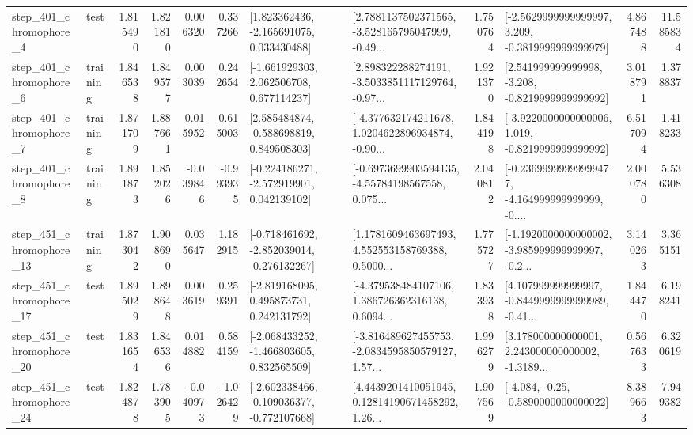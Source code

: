 \begin{tabular}{llrrrrllrlrr}
   step\_401\_chromophore\_4 &      test &      1.815490 &    1.821810 &      0.006320 &  0.337266 &    [1.823362436, -2.165691075, 0.033430488] &  [2.7881137502371565, -3.528165795047999, -0.49... &       1.750764 &  [-2.5629999999999997, 3.209, -0.3819999999999979] &            4.867488 &         11.585834 \\
   step\_401\_chromophore\_6 &  training &      1.846538 &    1.849577 &      0.003039 &  0.242654 &    [-1.661929303, 2.062506708, 0.677114237] &  [2.898322288274191, -3.5033851117129764, -0.97... &       1.921370 &   [2.541999999999998, -3.208, -0.8219999999999992] &            3.018791 &          1.378837 \\
   step\_401\_chromophore\_7 &  training &      1.871709 &    1.887661 &      0.015952 &  0.615003 &    [2.585484874, -0.588698819, 0.849508303] &  [-4.377632174211678, 1.0204622896934874, -0.90... &       1.844198 &  [-3.9220000000000006, 1.019, -0.8219999999999992] &            6.517094 &          1.418233 \\
   step\_401\_chromophore\_8 &  training &      1.891873 &    1.852026 &     -0.039846 & -0.993935 &   [-0.224186271, -2.572919901, 0.042139102] &  [-0.6973699903594135, -4.55784198567558, 0.075... &       2.040812 &  [-0.23699999999999477, -4.164999999999999, -0.... &            2.000780 &          5.536308 \\
  step\_451\_chromophore\_13 &  training &      1.873042 &    1.908690 &      0.035647 &  1.182915 &  [-0.718461692, -2.852039014, -0.276132267] &  [1.1781609463697493, 4.552553158769388, 0.5000... &       1.775727 &  [-1.1920000000000002, -3.985999999999997, -0.2... &            3.140263 &          3.365151 \\
  step\_451\_chromophore\_17 &      test &      1.895029 &    1.898648 &      0.003619 &  0.259391 &    [-2.819168095, 0.495873731, 0.242131792] &  [-4.379538484107106, 1.386726362316138, 0.6094... &       1.833938 &  [4.107999999999997, -0.8449999999999989, -0.41... &            1.844470 &          6.198241 \\
  step\_451\_chromophore\_20 &      test &      1.831654 &    1.846536 &      0.014882 &  0.584159 &   [-2.068433252, -1.466803605, 0.832565509] &  [-3.816489627455753, -2.0834595850579127, 1.57... &       1.996279 &  [3.178000000000001, 2.243000000000002, -1.3189... &            0.567633 &          6.320619 \\
  step\_451\_chromophore\_24 &      test &      1.824878 &    1.783905 &     -0.040973 & -1.026429 &  [-2.602338466, -0.109036377, -0.772107668] &  [4.4439201410051945, 0.12814190671458292, 1.26... &       1.907569 &               [-4.084, -0.25, -0.5890000000000022] &            8.389663 &          7.949382 \\

\end{tabular}

